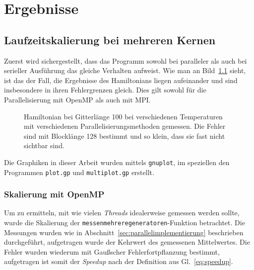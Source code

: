 	\chapter{Ergebnisse}
	\label{chap:ergebnisse}
	
	
	\section{Laufzeitskalierung bei mehreren Kernen}
	\label{sec:ergebnisparallel}
	Zuerst wird sichergestellt, dass das Programm sowohl bei paralleler als auch bei serieller Ausführung das gleiche Verhalten aufweist. Wie man an Bild~\ref{fig:vergleichham} sieht, ist das der Fall, die Ergebnisse des Hamiltonians liegen aufeinander und sind insbesondere in ihren Fehlergrenzen gleich. Dies gilt sowohl für die Parallelisierung mit OpenMP als auch mit MPI.
	
	\begin{figure}[htbp]
		
		\caption[Hamiltonian mit und ohne Parallelisierung]{Hamiltonian bei Gitterlänge 100 bei verschiedenen Temperaturen mit verschiedenen Parallelisierungsmethoden gemessen. Die Fehler sind mit Blocklänge 128 bestimmt und so klein, dass sie fast nicht sichtbar sind.}
		\label{fig:vergleichham}
	\end{figure}
	
	Die Graphiken in dieser Arbeit wurden mittels \texttt{gnuplot}\cite{gnuplotdoc}, im speziellen den Programmen \texttt{plot.gp} und \texttt{multiplot.gp} erstellt.
	
	\subsection{Skalierung mit OpenMP}
	\label{subsec:ergebnisseopenmp}
	
	Um zu ermitteln, mit wie vielen \textit{Threads} idealerweise gemessen werden sollte, wurde die Skalierung der \texttt{messenmehreregeneratoren}-Funktion betrachtet. Die Messungen wurden wie in Abschnitt~\ref{sec:parallelimplementierung} beschrieben durchgeführt, aufgetragen wurde der Kehrwert des gemessenen Mittelwertes. Die Fehler wurden wiederum mit Gaußscher Fehlerfortpflanzung bestimmt, aufgetragen ist somit der \textit{Speedup} nach der Definition aus Gl.~\ref{eq:speedup}.%
	
